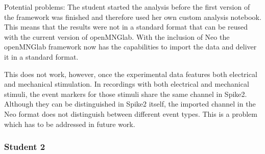 Potential problems: The student started the analysis before the first version of the framework was finished and therefore used her own custom analysis notebook. This means that the results were not in a standard format that can be reused with the current version of openMNGlab. With the inclusion of Neo the openMNGlab framework now has the capabilities to import the data and deliver it in a standard format.

This does not work, however, once the experimental data features both electrical and mechanical stimulation. In recordings with both electrical and mechanical stimuli, the event markers for those stimuli share the same channel in Spike2. Although they can be distinguished in Spike2 itself, the imported channel in the Neo format does not distinguish between different event types. This is a problem which has to be addressed in future work.
 
\subsubsection{Student 2}

